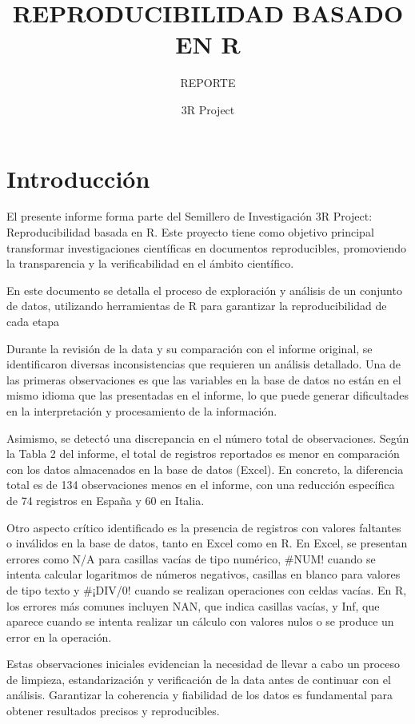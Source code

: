 \documentclass[
]{article}
\title{REPRODUCIBILIDAD BASADO EN R}
\subtitle{REPORTE}
\author{3R Project}
\date{}
\begin{document}
\maketitle

\section{Introducción}\label{introducciuxf3n}

El presente informe forma parte del Semillero de Investigación 3R
Project: Reproducibilidad basada en R. Este proyecto tiene como objetivo
principal transformar investigaciones científicas en documentos
reproducibles, promoviendo la transparencia y la verificabilidad en el
ámbito científico.

En este documento se detalla el proceso de exploración y análisis de un
conjunto de datos, utilizando herramientas de R para garantizar la
reproducibilidad de cada etapa

Durante la revisión de la data y su comparación con el informe original,
se identificaron diversas inconsistencias que requieren un análisis
detallado. Una de las primeras observaciones es que las variables en la
base de datos no están en el mismo idioma que las presentadas en el
informe, lo que puede generar dificultades en la interpretación y
procesamiento de la información.

Asimismo, se detectó una discrepancia en el número total de
observaciones. Según la Tabla 2 del informe, el total de registros
reportados es menor en comparación con los datos almacenados en la base
de datos (Excel). En concreto, la diferencia total es de 134
observaciones menos en el informe, con una reducción específica de 74
registros en España y 60 en Italia.

Otro aspecto crítico identificado es la presencia de registros con
valores faltantes o inválidos en la base de datos, tanto en Excel como
en R. En Excel, se presentan errores como N/A para casillas vacías de
tipo numérico, \#NUM! cuando se intenta calcular logaritmos de números
negativos, casillas en blanco para valores de tipo texto y \#¡DIV/0!
cuando se realizan operaciones con celdas vacías. En R, los errores más
comunes incluyen NAN, que indica casillas vacías, y Inf, que aparece
cuando se intenta realizar un cálculo con valores nulos o se produce un
error en la operación.

Estas observaciones iniciales evidencian la necesidad de llevar a cabo
un proceso de limpieza, estandarización y verificación de la data antes
de continuar con el análisis. Garantizar la coherencia y fiabilidad de
los datos es fundamental para obtener resultados precisos y
reproducibles.
\end{document}
